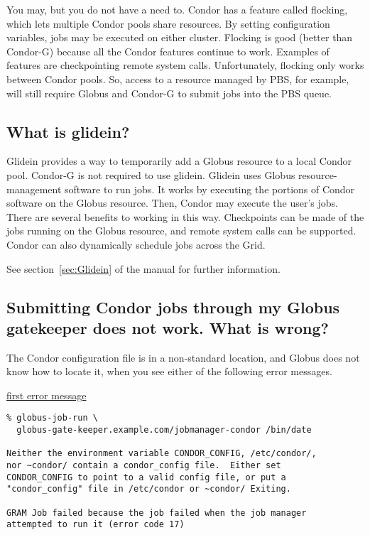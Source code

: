 You may, but you do not have a need to.
Condor has a feature called flocking,
which lets multiple Condor pools share resources.
By setting configuration variables, jobs may be executed on
either cluster.
Flocking is good (better than Condor-G) because
all the Condor features continue to work.
Examples of features are
checkpointing remote system calls.
Unfortunately, flocking only works between Condor pools.
So, access to a resource managed by PBS, for example,
will still require Globus and Condor-G to submit jobs into the PBS queue.

\subsection*{What is glidein?}

Glidein provides a way to temporarily add a Globus resource
to a local Condor pool.
Condor-G is not required to use glidein.
Glidein uses Globus resource-management software to run jobs.
It works by executing the portions of Condor
software on the Globus resource.
Then, Condor may execute the user's jobs.
There are several benefits to working in this way.
Checkpoints can be made of the jobs running on the Globus resource,
and remote system calls can be supported.
Condor can also dynamically schedule jobs across the Grid.

See section~\ref{sec:Glidein} of the manual
for further information.


\subsection*{Submitting Condor jobs through my Globus gatekeeper does not work.  What is wrong?}

The Condor configuration file is in a non-standard location,
and Globus does not know how to locate it, when you see either of the
following error messages.

\underline{first error message}
\footnotesize
\begin{verbatim}
% globus-job-run \
  globus-gate-keeper.example.com/jobmanager-condor /bin/date

Neither the environment variable CONDOR_CONFIG, /etc/condor/,
nor ~condor/ contain a condor_config file.  Either set
CONDOR_CONFIG to point to a valid config file, or put a
"condor_config" file in /etc/condor or ~condor/ Exiting.

GRAM Job failed because the job failed when the job manager
attempted to run it (error code 17)
\end{verbatim}
\normalsize

